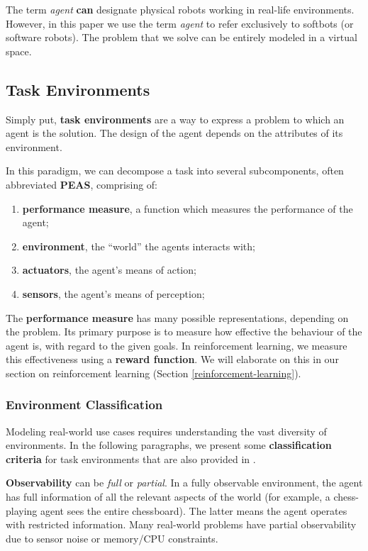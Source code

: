 The term \emph{agent} \textbf{can} designate physical robots working in real-life environments.
However, in this paper we use the term \textit{agent} to refer exclusively to softbots (or software robots).
The problem that we solve can be entirely modeled in a virtual space.

\subsection{Task Environments}
Simply put, \textbf{task environments} are a way to express a problem to which an agent is the solution.
The design of the agent depends on the attributes of its environment.

In this paradigm, we can decompose a task into several subcomponents, often abbreviated \textbf{PEAS}\cite{aima}, comprising of:
\begin{enumerate}
    \item \textbf{performance measure}, a function which measures the performance of the agent;
    \item \textbf{environment}, the ``world'' the agents interacts with;
    \item \textbf{actuators}, the agent's means of action;
    \item \textbf{sensors}, the agent's means of perception;
\end{enumerate}

The \textbf{performance measure} has many possible representations, depending on the problem.
Its primary purpose is to measure how effective the behaviour of the agent is, with regard to the given goals.
In reinforcement learning, we measure this effectiveness using a \textbf{reward function}.
We will elaborate on this in our section on reinforcement learning (Section \ref{reinforcement-learning}).

\subsubsection{Environment Classification}

Modeling real-world use cases requires understanding the vast diversity of environments.
In the following paragraphs, we present some \textbf{classification criteria} for task environments that are also provided in \cite{aima}.

\textbf{Observability} can be \emph{full} or \emph{partial}.
In a fully observable environment, the agent has full information of all the relevant aspects of the world (for example, a chess-playing agent sees the entire chessboard).
The latter means the agent operates with restricted information.
Many real-world problems have partial observability due to sensor noise or memory/CPU constraints.

